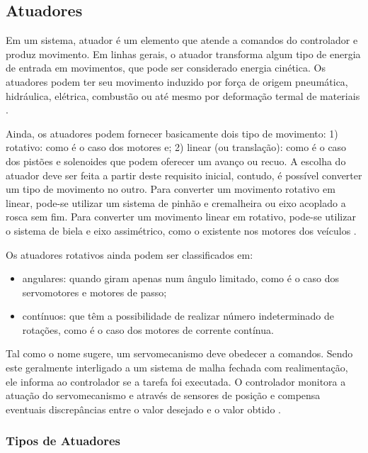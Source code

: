 \begin{anexosenv}
\subsection[Atuadores]{Atuadores}

Em um sistema, atuador é um elemento que atende a comandos do controlador e produz movimento. Em linhas gerais, o atuador transforma algum tipo de energia de entrada em movimentos, que pode ser considerado energia cinética. Os atuadores podem ter seu movimento induzido por força de origem pneumática, hidráulica, elétrica, combustão ou até mesmo por deformação termal de materiais \cite{machado}.

Ainda, os atuadores podem fornecer basicamente dois tipo de movimento: 1) rotativo: como é o caso dos motores e; 2) linear (ou translação): como é o caso dos pistões e solenoides que podem oferecer um avanço ou recuo. A escolha do atuador deve ser feita a partir deste requisito inicial, contudo, é possível converter um tipo de movimento no outro. Para converter um movimento rotativo em linear, pode-se utilizar um sistema de pinhão e cremalheira ou eixo acoplado a rosca sem fim. Para converter um movimento linear em rotativo, pode-se utilizar o sistema de biela e eixo assimétrico, como o existente nos motores dos veículos \cite{machado}.

Os atuadores rotativos ainda podem ser classificados em:
\begin{itemize}
	\item angulares: quando giram apenas num ângulo limitado, como é o caso dos servomotores e motores de passo;
	\item contínuos: que têm a possibilidade de realizar número indeterminado de rotações, como é o caso dos motores de corrente contínua.
\end{itemize}

Tal como o nome sugere, um servomecanismo deve obedecer a comandos. Sendo este geralmente interligado a um sistema de malha fechada com realimentação, ele informa ao controlador se a tarefa foi executada. O controlador monitora a atuação do servomecanismo e através de sensores de posição e compensa eventuais discrepâncias entre o valor desejado e o valor obtido \cite{SCME}.



\subsubsection[Tipos de Atuadores]{Tipos de Atuadores}


\end{anexosenv}
